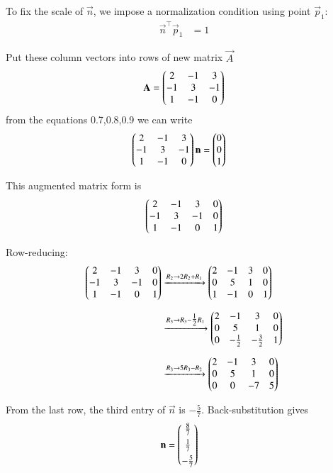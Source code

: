 \documentclass[journal]{IEEEtran}
\begin{document}
\noindent
To fix the scale of $\vec{n}$, we impose a normalization condition using point $\vec{p}_1$:
\begin{align}
\vec{n}^\top \vec{p}_1 &= 1
\end{align}

\noindent
Put these column vectors into rows of new matrix $\vec{A}$
\begin{align}
\mathbf{A} = \begin{pmatrix}2 & -1 & 3 \\ -1 & 3 & -1 \\ 1 & -1 & 0\end{pmatrix}
\end{align}
from the equations 0.7,0.8,0.9 we can write 
\begin{align}
\begin{pmatrix}2 & -1 & 3 \\ -1 & 3 & -1 \\ 1 & -1 & 0\end{pmatrix}\mathbf{n}
&= \begin{pmatrix}0 \\ 0 \\ 1\end{pmatrix}
\end{align}

\noindent
This augmented matrix form is
\begin{align}
\begin{pmatrix}2 & -1 & 3 & 0 \\ -1 & 3 & -1 & 0 \\ 1 & -1 & 0 & 1\end{pmatrix}
\end{align}

\noindent
Row-reducing:
\begin{align}
\begin{pmatrix}2 & -1 & 3 & 0 \\ -1 & 3 & -1 & 0 \\ 1 & -1 & 0 & 1\end{pmatrix}
&\xrightarrow{R_2 \to 2R_2+R_1}
\begin{pmatrix}2 & -1 & 3 & 0 \\ 0 & 5 & 1 & 0 \\ 1 & -1 & 0 & 1\end{pmatrix} \\[6pt]
&\xrightarrow{R_3 \to R_3 - \tfrac{1}{2}R_1}
\begin{pmatrix}2 & -1 & 3 & 0 \\ 0 & 5 & 1 & 0 \\ 0 & -\tfrac{1}{2} & -\tfrac{3}{2} & 1\end{pmatrix} \\[6pt]
&\xrightarrow{R_3 \to 5R_3 - R_2}
\begin{pmatrix}2 & -1 & 3 & 0 \\ 0 & 5 & 1 & 0 \\ 0 & 0 & -7 & 5\end{pmatrix}
\end{align}

\noindent
From the last row, the third entry of $\vec{n}$ is $-\tfrac{5}{7}$.  
Back-substitution gives
\begin{align}
\mathbf{n} &= \begin{pmatrix}\tfrac{8}{7} \\[4pt] \tfrac{1}{7} \\[4pt] -\tfrac{5}{7}\end{pmatrix}
\end{align}
\end{document}
